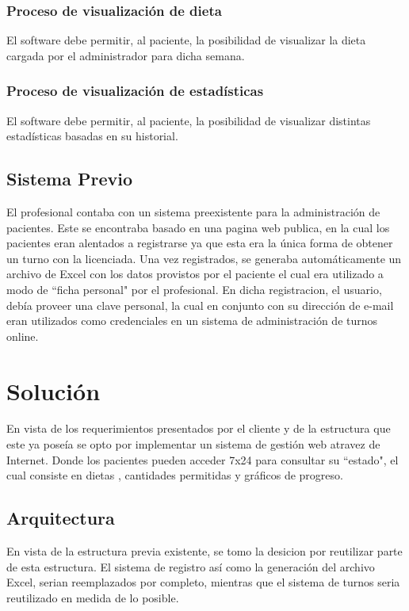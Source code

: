 \documentclass[runningheads,a4paper,spanish]{llncs}
\begin{document}
\subsubsection{Proceso de visualización de dieta}
 El software debe permitir, al paciente, la posibilidad de visualizar la dieta cargada por el administrador para dicha semana.
\subsubsection{Proceso de visualización de estadísticas}
 El software debe permitir, al paciente, la posibilidad de visualizar distintas estadísticas basadas en su historial.

\subsection{Sistema Previo}

El profesional contaba con un sistema preexistente para la administración de pacientes. Este se encontraba basado en una pagina web publica, en la cual los pacientes eran alentados a registrarse ya que esta era la única forma de obtener un turno con la licenciada. Una vez registrados, se generaba automáticamente un archivo de Excel con los datos provistos por el paciente el cual era utilizado a modo de “ficha personal" por el profesional. En dicha registracion, el usuario, debía proveer una clave personal, la cual en conjunto con su dirección de e-mail eran utilizados como credenciales en un sistema de administración de turnos online.

\section{Solución}

En vista de los requerimientos presentados por el cliente y de la estructura que este ya poseía se opto por implementar un sistema de gestión web atravez de Internet. Donde los pacientes pueden acceder 7x24 para consultar su “estado", el cual consiste en dietas , cantidades permitidas y gráficos de progreso. 

\subsection{Arquitectura}

En vista de la estructura previa existente, se tomo la desicion por reutilizar parte de esta estructura. El sistema de registro así como la generación del archivo Excel, serian reemplazados por completo, mientras que el sistema de turnos seria reutilizado en medida de lo posible.
\end{document}
